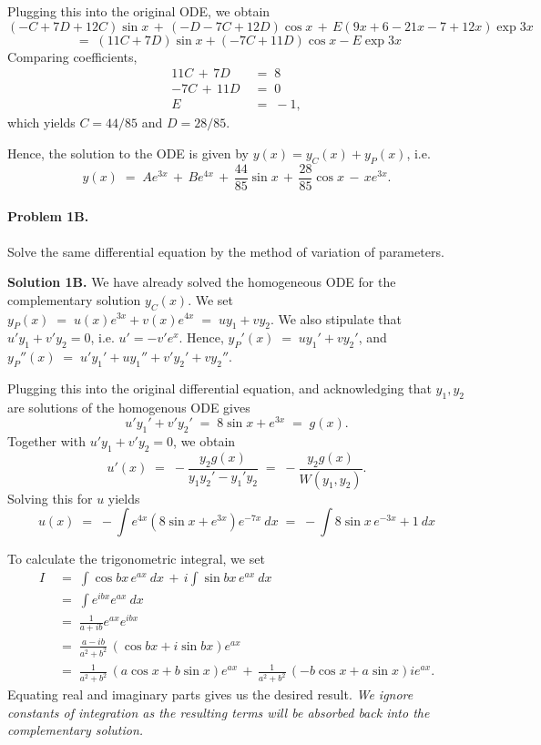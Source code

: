 \documentclass[10pt]{article}
\begin{document}
        Plugging this into the original ODE, we obtain
        \[
        (-C +7D + 12C)\sin{x} \,+\, (-D - 7C + 12D)\cos{x} \,+\, E(9x + 6 - 21x - 7 + 12x)\exp{3x}
        \]
        \[
        \;=\; (11C + 7D)\sin{x} + (-7C + 11D)\cos{x} - E\exp{3x}
        \]
        Comparing coefficients, 
        \begin{align*}
                11C \,+\, 7D  \;&=\; 8 \\
                -7C \,+\, 11D \;&=\; 0 \\
                E \;&=\; -1,
        \end{align*}
        which yields $C = 44 / 85$ and $D = 28 / 85$.

        Hence, the solution to the ODE is given by $y(x) = y_C(x) + y_P(x)$, i.e.
        \[
        y(x) \;=\; Ae^{3x} \,+\, Be^{4x} \,+\, \frac{44}{85}\sin{x} \,+\, \frac{28}{85}\cos{x} \,-\, xe^{3x}. \tag{\star}
        \]
        \clearpage

        \paragraph{Problem 1B.} Solve the same differential equation by the method of variation of parameters.

        \textbf{Solution 1B.} We have already solved the homogeneous ODE for the complementary solution $y_C(x)$.
        We set $y_P(x) \;=\; u(x)e^{3x} + v(x)e^{4x} \;=\; uy_1 + vy_2$.
        We also stipulate that $u'y_1 + v'y_2 = 0$, i.e. $u' = -v'e^{x}$.
        Hence, $y_P'(x) \;=\; uy_1' + vy_2'$, and $y_P''(x) \;=\; u'y_1' + uy_1'' + v'y_2' + vy_2''$.

        Plugging this into the original differential equation, and acknowledging that $y_1, y_2$ are solutions of the homogenous ODE gives
        \[
        u'y_1' + v'y_2'  \;=\; 8\sin{x} + e^{3x} \;=\; g(x).
        \]
        Together with $u'y_1 + v'y_2 = 0$, we obtain
        \[
        u'(x) \;=\; -\frac{y_2 g(x)}{y_1y_2' - y_1'y_2} \;=\; -\frac{y_2 g(x)}{W(y_1, y_2)}.
        \]
        Solving this for $u$ yields
        \[
        u(x) \;=\; -\int e^{4x} (8\sin{x} + e^{3x}) e^{-7x} \:dx \;=\; -\int 8\sin{x}\,e^{-3x} + 1 \:dx
        \]
        
        To calculate the trigonometric integral, we set 
        \begin{align*}
        I \;&=\; \int \cos{bx}\,e^{ax} \:dx \,+\, i\int \sin{bx}\,e^{ax} \:dx \\
        \;&=\; \int e^{ibx}e^{ax} \:dx \\
        \;&=\; \frac{1}{a + ib}e^{ax}e^{ibx} \\
        \;&=\; \frac{a - ib}{a^2 + b^2} \,(\cos{bx} + i\sin{bx})e^{ax} \\
        \;&=\; \frac{1}{a^2 + b^2}\, (a\cos{x} + b\sin{x})e^{ax} \,+\, \frac{1}{a^2 + b^2}\,(-b\cos{x} + a\sin{x})ie^{ax}.
        \end{align*}
        Equating real and imaginary parts gives us the desired result.
        {\it We ignore constants of integration as the resulting terms will be absorbed back into the complementary solution.}
\end{document}
